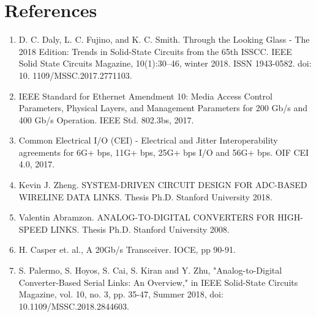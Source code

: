 \chapter{References}

\begin{enumerate} [1.] 
	\item  D. C. Daly, L. C. Fujino, and K. C. Smith. Through the Looking Glass - The 2018 Edition: Trends in Solid-State Circuits from the 65th ISSCC. IEEE Solid State Circuits Magazine, 10(1):30–46, winter 2018. ISSN 1943-0582. doi: 10. 1109/MSSC.2017.2771103.
	\item IEEE Standard for Ethernet Amendment 10: Media Access Control Parameters, Physical Layers, and Management Parameters for 200 Gb/s and 400 Gb/s Operation. IEEE Std. 802.3bs, 2017.
	\item Common Electrical I/O (CEI) - Electrical and Jitter Interoperability agreements for 6G+ bps, 11G+ bps, 25G+ bps I/O and 56G+ bps. OIF CEI 4.0, 2017.
	\item Kevin J. Zheng. SYSTEM-DRIVEN CIRCUIT DESIGN FOR ADC-BASED WIRELINE DATA LINKS. Thesis Ph.D. Stanford University 2018.
	\item Valentin Abramzon. ANALOG-TO-DIGITAL CONVERTERS FOR HIGH-SPEED LINKS. Thesis Ph.D. Stanford University 2008.
	\item H. Casper et. al., A 20Gb/s Transceiver. IOCE, pp 90-91.
	\item S. Palermo, S. Hoyos, S. Cai, S. Kiran and Y. Zhu, "Analog-to-Digital Converter-Based Serial Links: An Overview," in IEEE Solid-State Circuits Magazine, vol. 10, no. 3, pp. 35-47, Summer 2018, doi: 10.1109/MSSC.2018.2844603.
	


\end{enumerate}